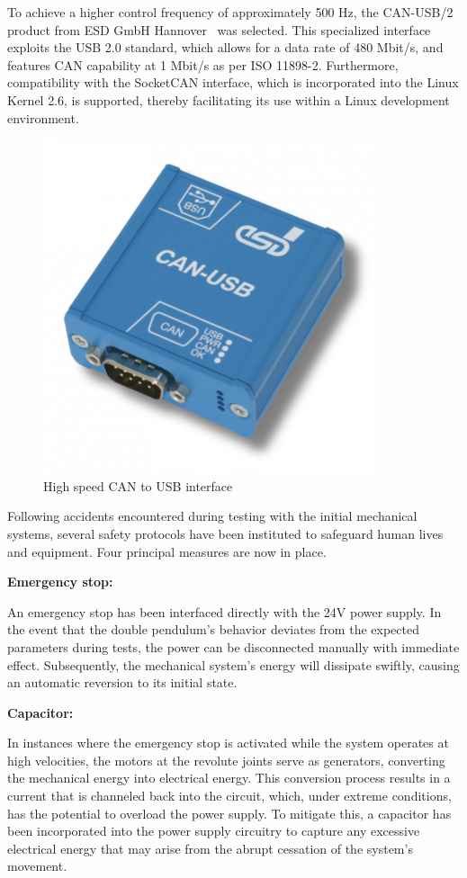 To achieve a higher control frequency of approximately 500 Hz, the CAN-USB/2 product from ESD GmbH Hannover~\cite{esdCANUSB2} was selected. This specialized interface exploits the USB 2.0 standard, which allows for a data rate of 480 Mbit/s, and features CAN capability at 1 Mbit/s as per ISO 11898-2. Furthermore, compatibility with the SocketCAN interface, which is incorporated into the Linux Kernel 2.6, is supported, thereby facilitating its use within a Linux development environment.

\begin{figure}[H]
    \centering
    \includegraphics[width=0.3\linewidth]{figures/hardware_setup/can_blue_box.png}
    \caption{High speed CAN to USB interface\cite{esdCANUSB2}}
    \label{fig:can_blue_box}
\end{figure}

Following accidents encountered during testing with the initial mechanical systems, several safety protocols have been instituted to safeguard human lives and equipment. Four principal measures are now in place.

\textbf{Emergency stop:}

An emergency stop has been interfaced directly with the 24V power supply. In the event that the double pendulum's behavior deviates from the expected parameters during tests, the power can be disconnected manually with immediate effect. Subsequently, the mechanical system's energy will dissipate swiftly, causing an automatic reversion to its initial state.

\textbf{Capacitor:}

In instances where the emergency stop is activated while the system operates at high velocities, the motors at the revolute joints serve as generators, converting the mechanical energy into electrical energy. This conversion process results in a current that is channeled back into the circuit, which, under extreme conditions, has the potential to overload the power supply. To mitigate this, a capacitor has been incorporated into the power supply circuitry to capture any excessive electrical energy that may arise from the abrupt cessation of the system's movement.

